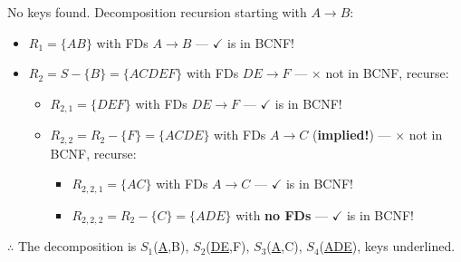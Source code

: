 \begin{theorem}
    No keys found. Decomposition recursion starting with $A \to B$:
    \begin{itemize}
        \item $R_1 = \{AB\}$ with FDs $A \to B$ --- $\checkmark$ is in BCNF!
        \item $R_2 = S - \{B\} = \{ACDEF\}$ with FDs $DE \to F$ --- $\times$ not in BCNF, recurse:
              \begin{itemize}
                  \item $R_{2,1} = \{DEF\}$ with FDs $DE \to F$ --- $\checkmark$ is in BCNF!
                  \item $R_{2,2} = R_2 - \{F\} = \{ACDE\}$ with FDs $A \to C$ (\textbf{implied!}) --- $\times$ not in BCNF, recurse:
                        \begin{itemize}
                            \item $R_{2,2,1} = \{AC\}$ with FDs $A \to C$ --- $\checkmark$ is in BCNF!
                            \item $R_{2,2,2} = R_2 - \{C\} = \{ADE\}$ with \textbf{no FDs} --- $\checkmark$ is in BCNF!
                        \end{itemize}
              \end{itemize}
    \end{itemize}

    $\therefore$ The decomposition is $S_1$(\underline{A},B), $S_2$(\underline{DE},F), $S_3$(\underline{A},C), $S_4$(\underline{ADE}), keys underlined.



\end{theorem}
